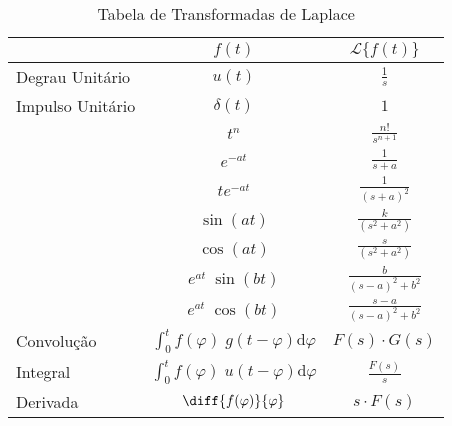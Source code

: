 \documentclass{article}
\begin{document}
                \begin{table}[H]
                    \centering
                    \begingroup
                    \renewcommand{\arraystretch}{1.25}
                    \begin{tabular}[]{lcc}
                                            & $f(t)$      & $\mathcal{L}\{ f(t) \}$\\\hline
                        Degrau Unitário  & $u(t)$      & $\frac{1}{s}$\\
                        Impulso Unitário & $\delta(t)$ & $1$\\
                                            & $t^{n}$     & $\frac{n!}{s^{n+1}}$\\
                                            & $e^{-at}$   & $\frac{1}{s+a}$\\
                                            & $te^{-at}$  & $\frac{1}{(s+a)^{2}}$\\
                                            & $\sin(at)$  & $\frac{k}{(s^2+a^2)}$\\
                                            & $\cos(at)$  & $\frac{s}{(s^2+a^2)}$\\
                                            & $e^{at}\;\sin(bt)$  & $\frac{b}{(s-a)^2+b^2}$\\
                                            & $e^{at}\;\cos(bt)$  & $\frac{s-a}{(s-a)^2+b^2}$\\
                        Convolução       & $\int_{0}^{t} f(\varphi)\;g(t - \varphi) \text{d}\varphi$ & $F(s)\cdot G(s)$\\
                        Integral         & $\int_{0}^{t} f(\varphi)\;u(t - \varphi) \text{d}\varphi$ & $\frac{F(s)}{s}$\\
                        Derivada         & $\diff{f(\varphi)}{\varphi} $ & $s\cdot F(s)$\\\hline
                    \end{tabular}
                    \endgroup
                    \caption{Tabela de Transformadas de Laplace}\label{table:Laplace}
                \end{table} \noindent
\end{document}

